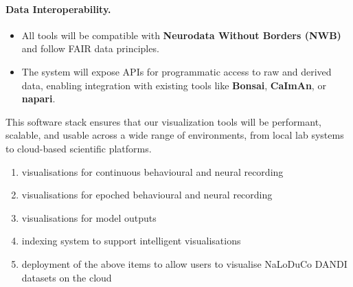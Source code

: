 \paragraph{Data Interoperability.}
\begin{itemize}
          \item All tools will be compatible with \textbf{Neurodata Without
              Borders (NWB)} and follow FAIR data principles.
                \item The system will expose APIs for programmatic access to
                    raw and derived data, enabling integration with existing
                    tools like \textbf{Bonsai}, \textbf{CaImAn}, or
                    \textbf{napari}.
\end{itemize}

This software stack ensures that our visualization tools will be performant,
scalable, and usable across a wide range of environments, from local lab
systems to cloud-based scientific platforms.


\begin{enumerate}

    \item visualisations for continuous behavioural and neural recording

    \item visualisations for epoched behavioural and neural recording

    \item visualisations for model outputs

    \item indexing system to support intelligent visualisations

    \item deployment of the above items to allow users to visualise NaLoDuCo
        DANDI datasets on the cloud

\end{enumerate}


